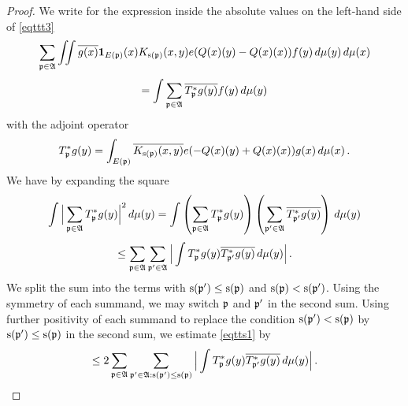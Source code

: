 \begin{proof}
\leanok
We write for the expression inside the absolute values on the left-hand side of \eqref{eqttt3}
\begin{equation}
  \sum_{{\mathfrak p} \in \mathfrak{A}}\iint \overline{g(x)} \mathbf{1}_{E({\mathfrak p})}(x)
  {K_{{\mathrm{s}}({\mathfrak p})}(x,y)}e({Q}(x)(y) -
   {Q}(x)(x))
   f(y)\, d\mu(y)\,d\mu(x)
\end{equation}
\begin{equation}
  =\int \sum_{{\mathfrak p} \in \mathfrak{A}} \overline{T_{{\mathfrak p}} ^*g(y)} f(y)\, d\mu(y)
\end{equation}
with the adjoint operator
\begin{equation}\label{eq-tstarwritten}
    T_{{\mathfrak p}}^*g(y)=\int_{E({\mathfrak p})} \overline{K_{{\mathrm{s}}({\mathfrak p})}(x,y)}e(-{Q}(x)(y)+
    {Q}(x)(x))g(x)\, d\mu(x)\, .
\end{equation}
We have by expanding the square
\begin{equation}
    \int \Big|\sum_{{\mathfrak p}\in \mathfrak{A}}T^*_{{\mathfrak p}}g(y)\Big|^2\, d\mu(y)=
    \int \left(\sum_{{\mathfrak p}\in \mathfrak{A}} T^*_{{\mathfrak p}}g(y)\right)
    \left(\sum_{{\mathfrak p}'\in \mathfrak{A}}\overline{T^*_{{\mathfrak p}'}g(y)}\right)\, d\mu(y)
\end{equation}
\begin{equation}\label{eqtts1}
    \le \sum_{{\mathfrak p}\in \mathfrak{A}} \sum_{{\mathfrak p}'\in \mathfrak{A}}
    \Big|\int T^*_{{\mathfrak p}}g(y)\overline{T^*_{{\mathfrak p}'}g(y)}\, d\mu(y)\Big|\,.
\end{equation}
We split the sum into the terms with ${\mathrm{s}}({\mathfrak p}')\le {\mathrm{s}}({\mathfrak p})$
and ${\mathrm{s}}({\mathfrak p})< {\mathrm{s}}({\mathfrak p}')$. Using the symmetry of each summand,
we may switch ${\mathfrak p}$ and ${\mathfrak p}'$ in the second sum. Using further positivity
of each summand to replace the condition ${\mathrm{s}}({\mathfrak p}')< {\mathrm{s}}({\mathfrak p})$
by ${\mathrm{s}}({\mathfrak p}')\le {\mathrm{s}}({\mathfrak p})$ in the second sum, we estimate \eqref{eqtts1} by
\begin{equation}\label{eqtts2}
    \le2 \sum_{{\mathfrak p}\in \mathfrak{A}} \sum_{{\mathfrak p}'\in \mathfrak{A}: {\mathrm{s}}({\mathfrak p}')\le {\mathrm{s}}({\mathfrak p})}
    \Big|\int T^*_{{\mathfrak p}}g(y)\overline{T^*_{{\mathfrak p}'}g(y)}\, d\mu(y)\Big|\,.
\end{equation}


\end{proof}
